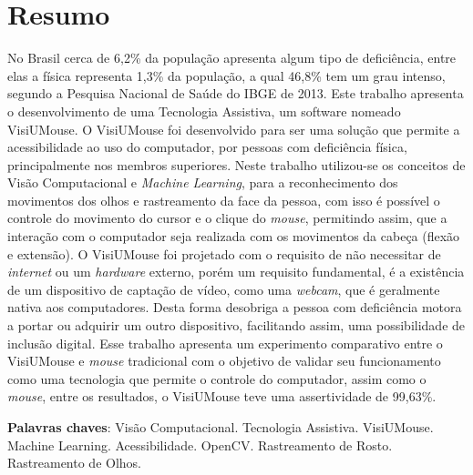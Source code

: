 \chapter*{Resumo}

\begin{singlespace}
{\fontsize{12pt}{\baselineskip} \selectfont \noindent
No Brasil cerca de 6,2\% da população apresenta algum tipo de deficiência, entre elas a física representa 1,3\% da população, a qual 46,8\% tem um grau intenso, segundo a {Pesquisa  Nacional de Saúde do IBGE de 2013}. Este trabalho apresenta o desenvolvimento de uma Tecnologia Assistiva, um software nomeado VisiUMouse. O VisiUMouse foi desenvolvido para ser uma solução que permite a acessibilidade ao uso do computador, por pessoas com deficiência física, principalmente nos membros superiores. Neste trabalho utilizou-se os conceitos de Visão Computacional e \textit{Machine Learning}, para a reconhecimento dos movimentos dos olhos e rastreamento da face da pessoa, com isso é possível o controle do movimento do cursor e o clique do \textit{mouse}, permitindo assim, que a interação com o computador seja realizada com os movimentos da cabeça (flexão e extensão). O VisiUMouse foi projetado com o requisito de não necessitar de \textit{internet} ou um \textit{hardware} externo, porém um requisito fundamental, é a existência de um dispositivo de captação de vídeo, como uma \textit{webcam}, que é geralmente nativa aos computadores. Desta forma desobriga a pessoa com deficiência motora a portar ou adquirir um outro dispositivo, facilitando assim, uma possibilidade de inclusão digital. Esse trabalho apresenta um experimento comparativo entre o VisiUMouse e \textit{mouse} tradicional com o objetivo de validar seu funcionamento como uma tecnologia que permite o controle do computador, assim como o \textit{mouse}, entre os resultados, o VisiUMouse teve uma assertividade de 99,63\%.

}
\end{singlespace}

\begin{singlespace}
\noindent \onehalfspacing
\textbf{Palavras chaves}: Visão Computacional. Tecnologia Assistiva. VisiUMouse. Machine Learning. Acessibilidade. OpenCV. Rastreamento de Rosto. Rastreamento de Olhos.
\end{singlespace}



